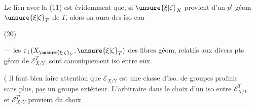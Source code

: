 
Le lien avec la  (11) est évidemment que, si $\unsure{\xi|\zeta}_X$ provient d'un $p^t$ géom $\unsure{\xi|\zeta}_T$ de $T$, alors on aura des iso can

(20)\quad
{}

 --- les $\pi_1(X_{\unsure{\xi|\zeta}_Y},\unsure{\xi|\zeta}_T)$ des fibres géom, relatifs aux divers pts géom de $\mathcal E_{X/Y}^T$, sont canoniquement iso entre eux.

( Il faut bien faire attention que $\mathcal E_{X/Y}$  est une classe d'iso. de groupes profinis sans plus, \uline{pas} un groupe extérieur. L'arbitraire dans le choix d'un iso entre $\mathcal E_{X/Y}^T$ et $\mathcal E_{X/Y}^{T'}$ provient du choix

